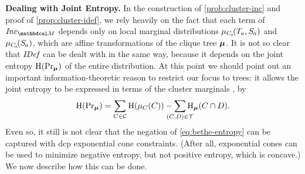 \documentclass[twoside]{article}
\begin{document}
\textbf{Dealing with Joint Entropy.}
%
In the construction of \eqref{prob:cluster-inc}
and proof of \cref{prop:cluster-idef}, we rely
heavily on the fact that
each term of $\Inc_{\dg M}$
depends only on local marginal distributions $\mu_{C_{\mskip-2mu a}}\!(\Tgt a,  \Src a)$
and $\mu_{C_{\mskip-2mu a}}\!(\Src a)$,
which are affine transformations of the clique tree $\boldsymbol\mu$.
It is not so clear that $\mathit{IDef}_{\!}$ can be dealt with in the same way, because it depends on the joint entropy $\operatorname{\mathrm{H}}(\Pr_{\boldsymbol\mu})$ of the entire distribution.
At this point we should point out an important information-theoretic reason to restrict our focus to trees:
it allows the joint entropy to be expressed
in terms of the cluster marginals \parencite{wainwright2008graphical},
by
\begin{equation}\label{eq:bethe-entropy}
    \H(\Pr\nolimits_{\bmu})
        = \sum_{C \in \mathcal C} \H(\mu_C(C))
        - \sum_{\mathclap{(C,D) \in \mathcal T}} \H_{\bmu}(C \cap D).
\end{equation}
Even so,
it still is not clear that the negation of \eqref{eq:bethe-entropy} can be
captured with dcp exponential cone constraints.
(After all, exponential cones can be used to minimize negative entropy, but not positive entropy, which is concave.)
We now describe how this can be done.
\end{document}
